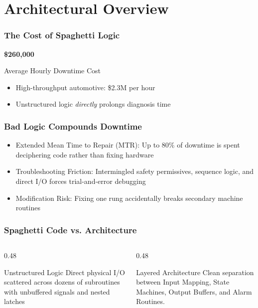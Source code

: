 \section{Architectural Overview}

\begin{frame}
    \frametitle{The Cost of Spaghetti Logic}

    \begin{center}
        {\Huge \textbf{\textcolor{BakerADARed}{\$260,000}}}

        \vspace{0.25em}
        Average Hourly Downtime Cost
    \end{center}

    \vspace{0.5in}
    \begin{itemize}
        \item High-throughput automotive: \$2.3M per hour
        \item Unstructured logic \emph{directly} prolongs diagnosis time
    \end{itemize}
\end{frame}

\begin{frame}
    \frametitle{Bad Logic Compounds Downtime}

    \begin{itemize}
        \item Extended Mean Time to Repair (MTR): Up to 80\% of downtime is spent deciphering code rather than fixing hardware
        \item Troubleshooting Friction: Intermingled safety permissives, sequence logic, and direct I/O forces trial-and-error debugging
        \item Modification Risk: Fixing one rung accidentally breaks secondary machine routines
    \end{itemize}
\end{frame}

\begin{frame}
    \frametitle{Spaghetti Code vs. Architecture}

    \begin{columns}
        \begin{column}{0.48\linewidth}
            \begin{block}{Unstructured Logic}
                Direct physical I/O scattered across dozens of subroutines with unbuffered signals and nested latches
            \end{block}
        \end{column}
        \begin{column}{0.48\linewidth}
            \begin{block}{Layered Architecture}
                Clean separation between Input Mapping, State Machines, Output Buffers, and Alarm Routines.
            \end{block}
        \end{column}
    \end{columns}
\end{frame}

